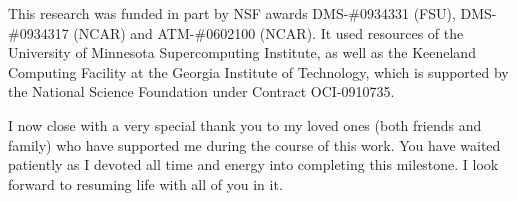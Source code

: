 \begin{acknowledgments}
This research was funded in part by NSF awards DMS-\#0934331 (FSU), DMS-\#0934317 (NCAR) and ATM-\#0602100 (NCAR). It used resources of the University of Minnesota Supercomputing Institute, as well as the Keeneland Computing Facility at the Georgia Institute of Technology, which is supported by the National Science Foundation under Contract OCI-0910735.

I now close with a very special thank you to my loved ones (both friends and family) who have supported me during the course of this work. You have waited patiently as I devoted all time and energy into completing this milestone. I look forward to resuming life with all of you in it. 

%
%

\end{acknowledgments}
